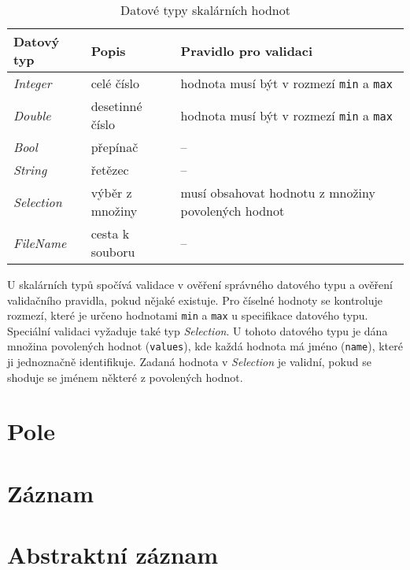 \documentclass[FM,MP]{tulthesis}
\begin{document}
	\begin{table}[h]
		\centering
		\caption{Datové typy skalárních hodnot}
		\label{tab:typy-skalaru}
		\begin{tabular}{|l|l|l|}
		\hline
		\textbf{Datový typ} & \textbf{Popis}           & \textbf{Pravidlo pro validaci}                                            \\
		\hline
		\textit{Integer}    & celé číslo      & hodnota musí být v rozmezí \texttt{min} a \texttt{max}               \\
		\textit{Double}     & desetinné číslo & hodnota musí být v rozmezí \texttt{min} a \texttt{max}               \\
		\textit{Bool}       & přepínač        & --                                                  \\
		\textit{String}     & řetězec         & --                                                  \\
		\textit{Selection}  & výběr z množiny & \parbox[t]{7cm}{musí obsahovat hodnotu z množiny povolených hodnot} \\
		\textit{FileName}   & cesta k souboru & --                                                  \\
		\hline
		\end{tabular}
	\end{table}

	U skalárních typů spočívá validace v ověření správného datového typu a ověření validačního pravidla, pokud nějaké existuje. Pro číselné hodnoty se kontroluje rozmezí, které je určeno hodnotami \texttt{min} a \texttt{max} u specifikace datového typu. Speciální validaci vyžaduje také typ \textit{Selection}. U tohoto datového typu je dána množina povolených hodnot (\texttt{values}), kde každá hodnota má jméno (\texttt{name}), které ji jednoznačně identifikuje. Zadaná hodnota v \textit{Selection} je validní, pokud se shoduje se jménem některé z povolených hodnot.

	\section{Pole}

	\section{Záznam}

	\section{Abstraktní záznam}
\end{document}
